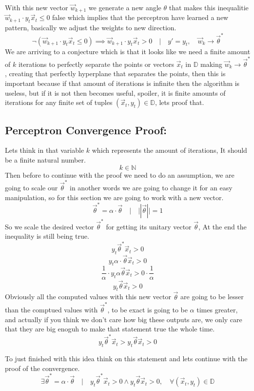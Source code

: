\documentclass[12pt]{article}
\begin{document}
With this new vector $\vec{w}_{k+1}$ we generate a new angle $\theta$ that makes
this inequalitie $\vec{w}_{k+1} \cdot y_t\vec{x}_t \le 0$
false 
which implies that the perceptron have learned a new pattern, basically we adjust the weights
 to new direction.
\[
  \neg (\vec{w}_{k+1} \cdot y_t\vec{x}_t \le 0) \implies \vec{w}_{k+1} \cdot y_t\vec{x}_t > 0\quad |
  \quad y' = y_t, \quad \vec{w}_k \rightarrow \vec{\theta}^*
\]
We are arriving to a conjecture which is that it looks like we need a finite amount of $k$
iterations to perfectly separate the points or vectors $\vec{x}_t$ in $\mathbb{D}$
making $\vec{w}_k \rightarrow \vec{\theta}^*$, creating that perfectly
hyperplane that separates the points,
then this is important because if that amount of iterations is infinite then the
algorithm is useless, but if
it is not then becomes useful,  spoiler, it is finite amounts of iterations for any finite
set of tuples $(\vec{x}_t, y_t) \in \mathbb{D}$, lets proof that.
\subsection{Perceptron Convergence Proof:}
Lets think in that variable $k$ which represents the amount of iterations,
It should be a finite natural number.
\[
  k \in \mathbb{N}
\]
Then before to continue with the proof we need to do an assumption,
we are going to scale our $\vec{\theta}^*$ in another words we are going to change it
for an easy manipulation,
so for this section we are going to work with a new vector.
\[
  \vec{\theta}^* = \alpha \cdot \vec{\theta}\quad |\quad ||\vec{\theta}|| = 1
\]
So we scale the desired vector $\vec{\theta}^*$ for getting its unitary vector $\vec{\theta}$,
At the end the inequality is still being true.
\[
  y_t\vec{\theta}^*\vec{x}_t > 0
\]
\[
  y_t\alpha\cdot\vec{\theta}\vec{x}_t > 0
\]
\[
  \frac{1}{\alpha} \cdot y_t\alpha\vec{\theta}\vec{x}_t > 0 \cdot \frac{1}{\alpha}
\]
\[
  y_t\vec{\theta}\vec{x}_t > 0
\]
Obviously all the computed values with this new vector $\vec{\theta}$ are going to be lesser than
the comptued values with $\vec{\theta}^*$, to be exact is going to be $\alpha$ times greater, and
actually if you think we don't care how big these outputs are, we only care
that they are big enoguh to make that statement true the whole time.
\[
  y_t\vec{\theta}^*\vec{x}_t > y_t\vec{\theta}\vec{x}_t > 0
\]

To just finished with this idea think on this statement
and lets continue with the proof of the convergence.
\[
  \exists \vec{\theta}^* = \alpha \cdot \vec{\theta}\quad|\quad
  y_t\vec{\theta}^*\vec{x}_t > 0 \wedge
  y_t\vec{\theta}\vec{x}_t > 0,
  \quad \forall(\vec{x}_t, y_t)
  \in \mathbb{D}
\]
\end{document}
